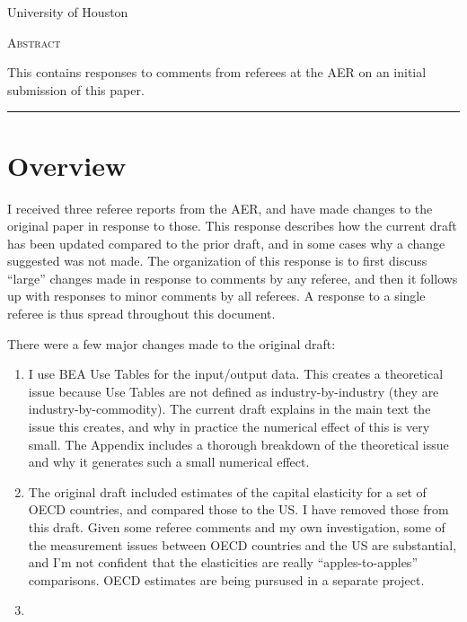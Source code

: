 \documentclass[11pt]{article}
\begin{document}
\begin{titlepage}
\vspace{2in} \noindent {\large \today}

\vspace{.5in} 

\vspace{.25in} 

\vspace{.05in} \noindent University of Houston

\vfill \noindent \textsc{Abstract} \hrulefill

\vspace{.05in} \noindent This contains responses to comments from referees at the AER on an initial submission of this paper.
 
\vspace{.1in} \hrule

\vspace{.1in} 
\end{titlepage}

\pagebreak 

\section{Overview}
\onehalfspacing I received three referee reports from the AER, and have made changes to the original paper in response to those. This response describes how the current draft has been updated compared to the prior draft, and in some cases why a change suggested was not made. The organization of this response is to first discuss ``large'' changes made in response to comments by any referee, and then it follows up with responses to minor comments by all referees. A response to a single referee is thus spread throughout this document.

There were a few major changes made to the original draft:
\begin{enumerate}
	\item I use BEA Use Tables for the input/output data. This creates a theoretical issue because Use Tables are not defined as industry-by-industry (they are industry-by-commodity). The current draft explains in the main text the issue this creates, and why in practice the numerical effect of this is very small. The Appendix includes a thorough breakdown of the theoretical issue and why it generates such a small numerical effect.
	\item The original draft included estimates of the capital elasticity for a set of OECD countries, and compared those to the US. I have removed those from this draft. Given some referee comments and my own investigation, some of the measurement issues between OECD countries and the US are substantial, and I'm not confident that the elasticities are really ``apples-to-apples'' comparisons. OECD estimates are being pursused in a separate project.
	\item 
\end{enumerate}
\end{document}
